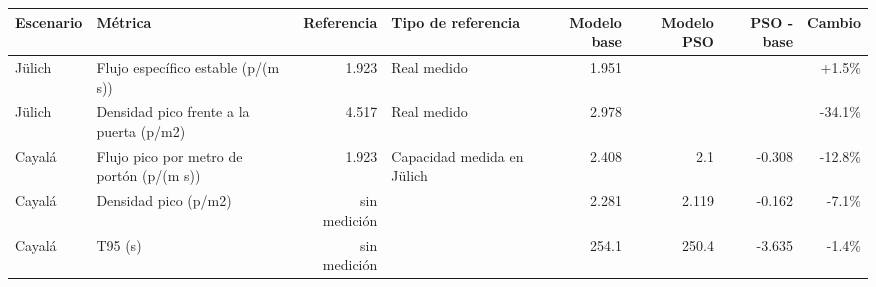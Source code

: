 \begin{tabular}{llrlrrrr}
\toprule
Escenario & Métrica & Referencia & Tipo de referencia & Modelo base & Modelo PSO & PSO - base & Cambio \\
\midrule
Jülich & Flujo específico estable (p/(m s)) & 1.923 & Real medido & 1.951 &  &  & +1.5\% \\
Jülich & Densidad pico frente a la puerta (p/m2) & 4.517 & Real medido & 2.978 &  &  & -34.1\% \\
Cayalá & Flujo pico por metro de portón (p/(m s)) & 1.923 & Capacidad medida en Jülich & 2.408 & 2.1 & -0.308 & -12.8\% \\
Cayalá & Densidad pico (p/m2) & sin medición &  & 2.281 & 2.119 & -0.162 & -7.1\% \\
Cayalá & T95 (s) & sin medición &  & 254.1 & 250.4 & -3.635 & -1.4\% \\
\bottomrule
\end{tabular}
